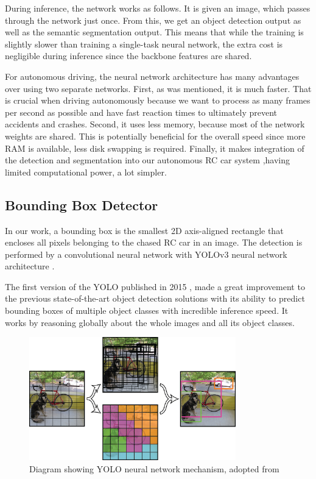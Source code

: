 \documentclass{ctuthesis/ctuthesis}
\begin{document}
During inference, the network works as follows. It is given an image, which passes through the network just once. From this, we get an object detection output as well as the semantic segmentation output. This means that while the training is slightly slower than training a single-task neural network, the extra cost is negligible during inference since the backbone features are shared. \par


For autonomous driving, the neural network architecture has many advantages over using two separate networks. First, as was mentioned, it is much faster. That is crucial when driving autonomously because we want to process as many frames per second as possible and have fast reaction times to ultimately prevent accidents and crashes. Second, it uses less memory, because most of the network weights are shared. This is potentially beneficial for the overall speed since more RAM is available, less disk swapping is required. Finally, it makes integration of the detection and segmentation into our autonomous RC car system ,having limited computational power, a lot simpler.




\subsection{Bounding Box Detector} \label{s:detection}
In our work, a bounding box is the smallest 2D axis-aligned rectangle that encloses all pixels belonging to the chased RC car in an image. The detection is performed by a convolutional neural network \cite{CNN_Lecun} with YOLOv3 neural network architecture \cite{YOLOv3}. \par 
The first version of the YOLO published in 2015 \cite{YOLO}, made a great improvement to the previous state-of-the-art object detection solutions with its ability to predict bounding boxes of multiple object classes with incredible inference speed. It works by reasoning globally about the whole images and all its object classes. \par


\begin{figure}[h!]
    \centering
    \includegraphics[width=0.8\textwidth]{images/YOLO.png}
    
    \caption[Diagram showing YOLO neural network mechanism]{Diagram showing YOLO neural network mechanism, adopted from \protect\cite{YOLO}}\label{f:YOLO}
\end{figure}
\end{document}
